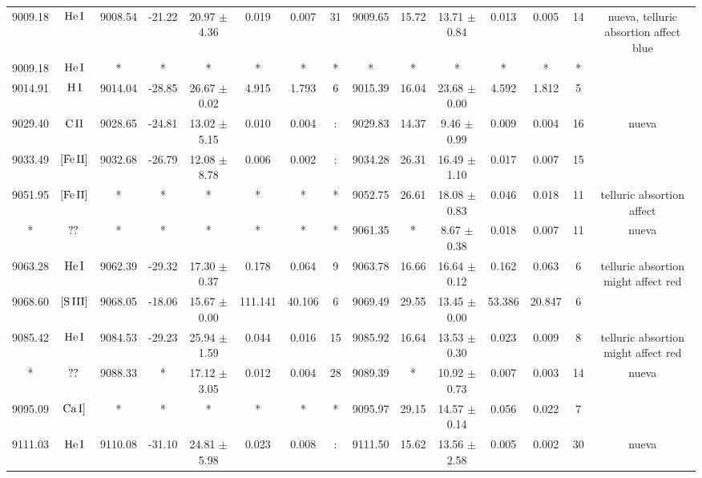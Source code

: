 \documentclass{article}
\begin{document}
\begin{table*}
\begin{adjustbox}{width=\textwidth}
\begin{tabular}{ccccccccccccccc}
9009.18 & $\mbox{He}\thinspace \mbox{I}$ & 9008.54 & -21.22 & 20.97 $\pm$ 4.36 & 0.019 & 0.007 & 31 & 9009.65 & 15.72 & 13.71 $\pm$ 0.84 & 0.013 & 0.005 & 14 &  nueva, telluric absortion affect blue \\
9009.18 & $\mbox{He}\thinspace \mbox{I}$ & * & * & * & * & * & * & * & * & * & * & * & * &  \\
9014.91 & $\mbox{H}\thinspace \mbox{I}$ & 9014.04 & -28.85 & 26.67 $\pm$ 0.02 & 4.915 & 1.793 & 6 & 9015.39 & 16.04 & 23.68 $\pm$ 0.00 & 4.592 & 1.812 & 5 &  \\
9029.40 & $\mbox{C}\thinspace \mbox{II}$ & 9028.65 & -24.81 & 13.02 $\pm$ 5.15 & 0.010 & 0.004 & : & 9029.83 & 14.37 & 9.46 $\pm$ 0.99 & 0.009 & 0.004 & 16 &  nueva \\
9033.49 & $\mbox{[Fe}\thinspace \mbox{II]}$ & 9032.68 & -26.79 & 12.08 $\pm$ 8.78 & 0.006 & 0.002 & : & 9034.28 & 26.31 & 16.49 $\pm$ 1.10 & 0.017 & 0.007 & 15 &  \\
9051.95 & $\mbox{[Fe}\thinspace \mbox{II]}$ & * & * & * & * & * & * & 9052.75 & 26.61 & 18.08 $\pm$ 0.83 & 0.046 & 0.018 & 11 &  telluric absortion affect \\
* & $\mbox{??}\thinspace \mbox{}$ & * & * & * & * & * & * & 9061.35 & * & 8.67 $\pm$ 0.38 & 0.018 & 0.007 & 11 &  nueva \\
9063.28 & $\mbox{He}\thinspace \mbox{I}$ & 9062.39 & -29.32 & 17.30 $\pm$ 0.37 & 0.178 & 0.064 & 9 & 9063.78 & 16.66 & 16.64 $\pm$ 0.12 & 0.162 & 0.063 & 6 &  telluric absortion might affect red \\
9068.60 & $\mbox{[S}\thinspace \mbox{III]}$ & 9068.05 & -18.06 & 15.67 $\pm$ 0.00 & 111.141 & 40.106 & 6 & 9069.49 & 29.55 & 13.45 $\pm$ 0.00 & 53.386 & 20.847 & 6 &  \\
9085.42 & $\mbox{He}\thinspace \mbox{I}$ & 9084.53 & -29.23 & 25.94 $\pm$ 1.59 & 0.044 & 0.016 & 15 & 9085.92 & 16.64 & 13.53 $\pm$ 0.30 & 0.023 & 0.009 & 8 &  telluric absortion might affect red \\
* & $\mbox{??}\thinspace \mbox{}$ & 9088.33 & * & 17.12 $\pm$ 3.05 & 0.012 & 0.004 & 28 & 9089.39 & * & 10.92 $\pm$ 0.73 & 0.007 & 0.003 & 14 &  nueva \\
9095.09 & $\mbox{Ca}\thinspace \mbox{I]}$ & * & * & * & * & * & * & 9095.97 & 29.15 & 14.57 $\pm$ 0.14 & 0.056 & 0.022 & 7 &  \\
9111.03 & $\mbox{He}\thinspace \mbox{I}$ & 9110.08 & -31.10 & 24.81 $\pm$ 5.98 & 0.023 & 0.008 & : & 9111.50 & 15.62 & 13.56 $\pm$ 2.58 & 0.005 & 0.002 & 30 &  nueva \\

\end{tabular}
\end{adjustbox}
\end{table*}
\end{document}
